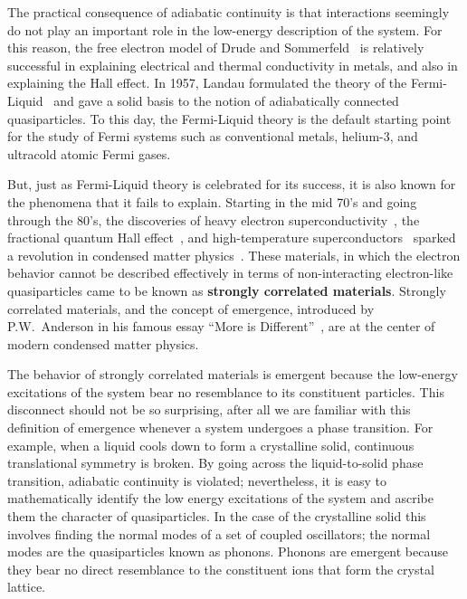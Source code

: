 \documentclass[oneside,11pt]{memoir}
\begin{document}
The practical consequence of adiabatic continuity is that interactions
seemingly do not play an important role in the low-energy description of the
system.  For this reason, the free electron model of Drude and
Sommerfeld~\cite{ashcroft1976solid} is relatively successful in explaining
electrical and thermal conductivity in metals,  and also in explaining the Hall
effect.   In 1957, Landau formulated the theory of the
Fermi-Liquid~\cite{landau1965collected} and gave a solid basis to the notion of
adiabatically connected quasiparticles.  To this day, the Fermi-Liquid theory
is the default starting point for the study of Fermi systems such as
conventional metals, helium-3, and ultracold atomic Fermi gases.   

But, just as Fermi-Liquid theory is celebrated for its success, it is also
known for the phenomena that it fails to explain.   Starting in the mid 70's
and going through the 80's, the discoveries of heavy electron
superconductivity~\cite{PhysRevLett.35.1779,PhysRevLett.43.1892},  the
fractional quantum Hall effect~\cite{PhysRevLett.48.1559,PhysRevLett.50.1395},
and high-temperature superconductors~\cite{Zeitschrift.64.189} sparked a
revolution in condensed matter physics~\cite{coleman2004revolution}.   These
materials, in which the electron behavior cannot be described effectively in
terms of non-interacting electron-like quasiparticles came to be known as
\textbf{strongly correlated materials}.   Strongly correlated materials, and
the concept of emergence, introduced by P.W.~Anderson in his famous essay
``More is Different''~\cite{Anderson1972}, are at the center of modern
condensed matter physics. 

The behavior of strongly correlated materials is emergent because the
low-energy excitations of the system bear no resemblance to its constituent
particles.  This disconnect should not be so surprising, after all we are
familiar with this definition of emergence whenever a system undergoes a phase
transition.  For example, when a liquid cools down to form a crystalline solid,
continuous translational symmetry is broken.    By going across the
liquid-to-solid phase transition, adiabatic continuity is violated;
nevertheless, it is easy to mathematically identify the low energy excitations
of the system and ascribe them the character of quasiparticles.  In the case of
the crystalline solid this involves finding the normal modes of a set of
coupled oscillators; the normal modes are the quasiparticles known as phonons.
Phonons are emergent because they bear no direct resemblance to the constituent
ions that form the crystal lattice. 
\end{document}
